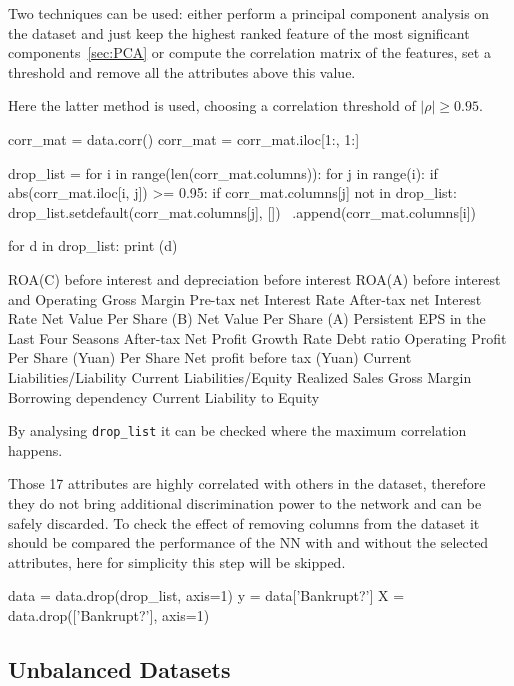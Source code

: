 Two techniques can be used: either perform a principal component analysis on the dataset and just keep the highest ranked feature of the most significant components~\ref{sec:PCA} or compute the correlation matrix of the features, set a threshold and remove all the attributes above this value.

Here the latter method is used, choosing a correlation threshold of $|\rho|\geq 0.95$.

\begin{ipython}
corr_mat = data.corr()
corr_mat = corr_mat.iloc[1:, 1:]
	
drop_list = {}
for i in range(len(corr_mat.columns)):
    for j in range(i):
        if abs(corr_mat.iloc[i, j]) >= 0.95:
            if corr_mat.columns[j] not in drop_list:
                drop_list.setdefault(corr_mat.columns[j], []) \
                    .append(corr_mat.columns[i])

for d in drop_list:
    print (d)
\end{ipython}
\begin{ioutput}
ROA(C) before interest and depreciation before interest
ROA(A) before interest and %
Operating Gross Margin
Pre-tax net Interest Rate
After-tax net Interest Rate
Net Value Per Share (B)
Net Value Per Share (A)
Persistent EPS in the Last Four Seasons
After-tax Net Profit Growth Rate
Debt ratio %
Operating Profit Per Share (Yuan)
Per Share Net profit before tax (Yuan)
Current Liabilities/Liability
Current Liabilities/Equity
Realized Sales Gross Margin
Borrowing dependency
Current Liability to Equity
\end{ioutput}
\noindent 
By analysing \texttt{drop\_list} it can be checked where the maximum correlation happens.

Those 17 attributes are highly correlated with others in the dataset, therefore they do not bring additional discrimination power to the network and can be safely discarded. To check the effect of removing columns from the dataset it should be compared the performance of the NN with and without the selected attributes, here for simplicity this step will be skipped.

\begin{ipython}
data = data.drop(drop_list, axis=1)
y = data['Bankrupt?']
X = data.drop(['Bankrupt?'], axis=1)
\end{ipython}

\subsection{Unbalanced Datasets}

